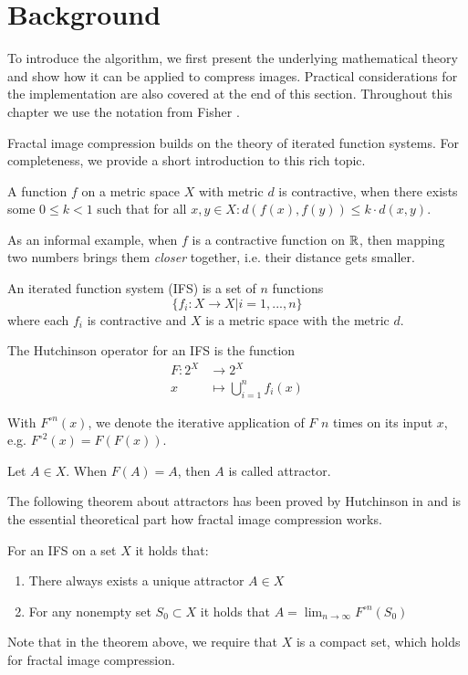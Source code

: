 \section{Background}\label{sec:background}

To introduce the algorithm, we first present the underlying mathematical theory
and show how it can be applied to compress images. Practical considerations for
the implementation are also covered at the end of this section. Throughout this
chapter we use the notation from Fisher \cite{fisher2012}.

Fractal image compression builds on the theory of iterated function systems. For completeness,
we provide a short introduction to this rich topic.
\begin{definition}
    A function $f$ on a metric space $X$ with metric $d$ is contractive, when there exists some $0 \leq k < 1$
    such that for all $x,y \in X: d(f(x), f(y)) \leq k \cdot d(x,y)$.
\end{definition}
As an informal example, when $f$ is a contractive function on $\mathbb{R}$, then mapping two numbers brings them \textit{closer} together,
i.e. their distance gets smaller.
\begin{definition}
    An iterated function system (IFS) is a set of $n$ functions $$\{f_i:X \to X | i=1,...,n\}$$
    where each $f_i$ is contractive and $X$ is a metric space with the metric $d$.
\end{definition}
\begin{definition}
    The Hutchinson operator for an IFS is the function
    \begin{align*}
        F \colon 2^X &\to 2^X\\
        x &\mapsto \bigcup_{i=1}^n f_i(x)
    \end{align*}
\end{definition}
With $F^{\circ n}(x)$, we denote the iterative application of $F$ $n$ times on its input $x$, e.g. $F^{\circ 2}(x) = F(F(x))$.
\begin{definition}
    Let $A \in X$. When $F(A)=A$, then $A$ is called attractor.
\end{definition}
The following theorem about attractors has been proved by Hutchinson in \cite{hutchinson1981fractals} and is
the essential theoretical part how fractal image compression works.
\begin{theorem}\label{theorem-fixpoint}
    For an IFS on a set $X$ it holds that:
    \begin{enumerate}
        \item There always exists a unique attractor $A \in X$
        \item For any nonempty set $S_0 \subset X$ it holds that $A = \lim_{n \to \infty} F^{\circ n}(S_0)$
    \end{enumerate}
\end{theorem}
Note that in the theorem above, we require that $X$ is a compact set, which holds for fractal image compression.

